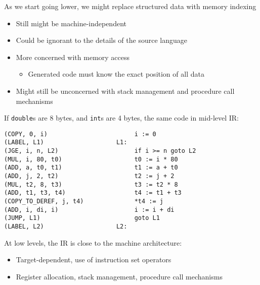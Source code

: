 \documentclass[../index.tex]{subfiles}
\begin{document}
\begin{frame}[fragile]{\currenttitle}
  As we start going lower, we might replace structured data with memory
  indexing

  \begin{itemize}
    \item Still might be machine-independent
    \item Could be ignorant to the details of the source language
    \item More concerned with memory access
      \begin{itemize}
        \item Generated code must know the exact position of all data
      \end{itemize}
    \item Might still be unconcerned with stack management and procedure call
      mechanisms
  \end{itemize}
\end{frame}
  
\begin{frame}[fragile]{\currenttitle}
  If \texttt{double}s are 8 bytes, and \texttt{int}s are 4 bytes, the same code
  in mid-level IR: \\[1.5em]

  \begin{lstlisting}[xleftmargin=0.5cm]
(COPY, 0, i)                        i := 0
(LABEL, L1)                    L1:
(JGE, i, n, L2)                     if i >= n goto L2
(MUL, i, 80, t0)                    t0 := i * 80
(ADD, a, t0, t1)                    t1 := a + t0
(ADD, j, 2, t2)                     t2 := j + 2
(MUL, t2, 8, t3)                    t3 := t2 * 8
(ADD, t1, t3, t4)                   t4 := t1 + t3
(COPY_TO_DEREF, j, t4)              *t4 := j
(ADD, i, di, i)                     i := i + di
(JUMP, L1)                          goto L1
(LABEL, L2)                    L2:
  \end{lstlisting}

\end{frame}
  
\begin{frame}[fragile]{\currenttitle}
  At low levels, the IR is close to the machine architecture:

  \begin{itemize}
    \item Target-dependent, use of instruction set operators
    \item Register allocation, stack management, procedure call mechanisms
  \end{itemize}
\end{frame}
  
\end{document}
